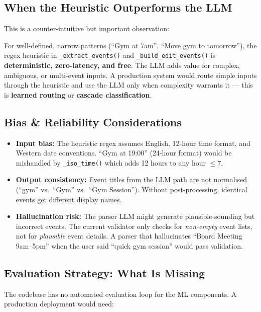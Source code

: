 \documentclass[12pt, a4paper]{article}
\begin{document}
\subsection{When the Heuristic Outperforms the LLM}

This is a counter-intuitive but important observation:

\begin{keybox}
  For well-defined, narrow patterns (``Gym at 7am'', ``Move gym to tomorrow''), the regex heuristic in \texttt{\_extract\_events()} and \texttt{\_build\_edit\_events()} is \textbf{deterministic, zero-latency, and free}. The LLM adds value for complex, ambiguous, or multi-event inputs. A production system would route simple inputs through the heuristic and use the LLM only when complexity warrants it --- this is \textbf{learned routing} or \textbf{cascade classification}.
\end{keybox}

\subsection{Bias \& Reliability Considerations}

\begin{itemize}
  \item \textbf{Input bias:} The heuristic regex assumes English, 12-hour time format, and Western date conventions. ``Gym at 19:00'' (24-hour format) would be mishandled by \texttt{\_iso\_time()} which adds 12 hours to any hour $\leq 7$.
  \item \textbf{Output consistency:} Event titles from the LLM path are not normalised (``gym'' vs.\ ``Gym'' vs.\ ``Gym Session''). Without post-processing, identical events get different display names.
  \item \textbf{Hallucination risk:} The parser LLM might generate plausible-sounding but incorrect events. The current validator only checks for \emph{non-empty} event lists, not for \emph{plausible} event details. A parser that hallucinates ``Board Meeting 9am--5pm'' when the user said ``quick gym session'' would pass validation.
\end{itemize}

\subsection{Evaluation Strategy: What Is Missing}

The codebase has no automated evaluation loop for the ML components. A production deployment would need:
\end{document}
